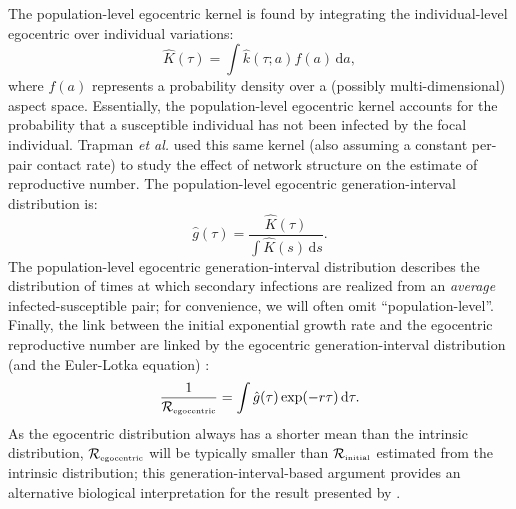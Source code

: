 \documentclass[12pt]{article}
\newcommand{\Rx}[1]{\ensuremath{{\mathcal R}_{#1}}\xspace}
\newcommand{\RR}{\ensuremath{{\mathcal R}}}
\newcommand{\Rini}{\Rx{\textrm{\tiny initial}}}
\newcommand{\Rego}{\Rx{\textrm{\tiny egocentric}}}
\newcommand{\Rhat}{\ensuremath{{\hat\RR}}}
\begin{document}
The population-level egocentric kernel is found by integrating the individual-level egocentric over individual variations:
\begin{equation}\label{eq:ego}
\hat{K}(\tau) = \int \hat{k}(\tau; a) f(a) \,\mathrm{d}a,
\end{equation}
where $f(a)$ represents a probability density over a (possibly multi-dimensional) aspect space.
Essentially, the population-level egocentric kernel accounts for the probability that a susceptible individual has not been infected by the focal individual.
Trapman \textit{et al.} \cite{trapman2016inferring} used this same kernel (also assuming a constant per-pair contact rate) to study the effect of network structure on the estimate of reproductive number.
The population-level egocentric generation-interval distribution is:
\begin{equation}
\hat{g}(\tau) = \frac{\hat{K}(\tau)}{\int \hat{K}(s)\,\mathrm{d}s}.
\label{eq:conditional}
\end{equation}
The population-level egocentric generation-interval distribution describes the distribution of times at which secondary infections are realized from an \emph{average} infected-susceptible pair; for convenience, we will often omit ``population-level''.
Finally, the link between the initial exponential growth rate and the egocentric reproductive number are linked by the egocentric generation-interval distribution (and the Euler-Lotka equation) \citep{trapman2016inferring}:
\begin{equation}
\frac{1}{\Rego} = \int \hat{g}(\tau) \exp(-r \tau)\,\mathrm{d}\tau.
\label{eq:egorR}
\end{equation}
As the egocentric distribution always has a shorter mean than the intrinsic distribution, $\Rego$ will be typically smaller than $\Rini$ estimated from the intrinsic distribution;
this generation-interval-based argument provides an alternative biological interpretation for the result presented by \cite{trapman2016inferring}.
\end{document}
